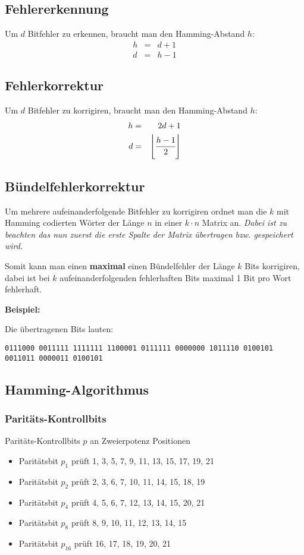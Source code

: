 \documentclass
[
	8pt,		%
	ngerman,	%
	a4paper,	%
	landscape,	%
	final		%
]{extarticle}
\newcommand*\example{\par\vspace{\abovedisplayskip}\textbf{Beispiel:}\par}
\newcommand{\includefigure}[1]{\begin{center}\end{center}}
\begin{document}
\begin{multicols*}{4}
\subsection{Fehlererkennung}
Um $d$ Bitfehler zu erkennen, braucht man den Hamming-Abstand $h$:
\begin{eqnarray*}
	h &=& d + 1 \\
	d &=& h - 1
\end{eqnarray*}
\subsection{Fehlerkorrektur}
Um $d$ Bitfehler zu korrigiren, braucht man den Hamming-Abstand $h$:
\begin{eqnarray*}
	h &=& 2d + 1 \\
	d &=& \left\lfloor\cfrac{h - 1}{2}\right\rfloor
\end{eqnarray*}
\subsection{Bündelfehlerkorrektur}
Um mehrere aufeinanderfolgende Bitfehler zu korrigiren ordnet man die $k$ mit Hamming
codierten Wörter der Länge $n$ in einer $k \cdot n$ Matrix an. \emph{Dabei ist zu
	beachten das nun zuerst die erste Spalte der Matrix übertragen bzw. gespeichert wird.}\par
Somit kann man einen \textbf{maximal} einen Bündelfehler der Länge $k$ Bits korrigiren,
dabei ist bei $k$ aufeinanderfolgenden fehlerhaften Bits maximal 1 Bit pro Wort fehlerhaft.

\example
\includefigure{./Documents/Graphics/Hamming-Abbildung-1.tex}
Die übertragenen Bits lauten:\par
\texttt{0111000 0011111 1111111 1100001 0111111 0000000 1011110 0100101 0011011 0000011 0100101}
\subsection{Hamming-Algorithmus}
\subsubsection*{Paritäts-Kontrollbits}
Paritäts-Kontrollbits $p$ an Zweierpotenz Positionen
\begin{itemize}
	\item Paritätsbit $p_{1}$ prüft 1, 3, 5, 7, 9, 11, 13, 15, 17, 19, 21
	\item Paritätsbit $p_{2}$ prüft 2, 3, 6, 7, 10, 11, 14, 15, 18, 19
	\item Paritätsbit $p_{4}$ prüft 4, 5, 6, 7, 12, 13, 14, 15, 20, 21
	\item Paritätsbit $p_{8}$ prüft 8, 9, 10, 11, 12, 13, 14, 15
	\item Paritätsbit $p_{16}$ prüft 16, 17, 18, 19, 20, 21
\end{itemize}


\end{multicols*}
\end{document}
